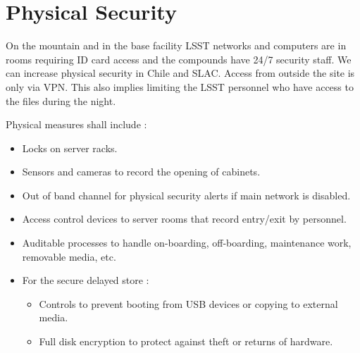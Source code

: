 \section {Physical Security}

On the mountain and in the base facility LSST networks and computers are in rooms requiring ID card access and the compounds have 24/7 security staff. We can increase physical security in Chile and SLAC.
Access from outside the site is only via VPN.
This also implies limiting the LSST personnel who have access to the files during the night.


 {
Physical measures shall include :
\begin{itemize}
\item Locks on server racks.
\item Sensors and cameras to record the opening of cabinets.
\item Out of band channel for physical security alerts if main network is disabled.
\item Access control devices to server rooms that record entry/exit by personnel.
\item Auditable processes to handle on-boarding, off-boarding, maintenance work, removable media, etc.
\item For the secure delayed store :
	\begin{itemize}
	\item Controls to prevent booting from USB devices or copying to external media.
	\item Full disk encryption to protect against theft or returns of hardware.
	\end{itemize}
\end{itemize}

}




